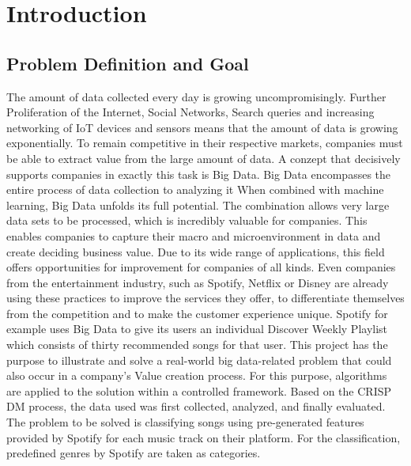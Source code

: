 \section{Introduction}

\subsection{Problem Definition and Goal}
The amount of data collected every day is growing uncompromisingly. Further Proliferation of the Internet, Social Networks, 
Search queries and increasing networking of IoT devices and sensors means that the amount of data is growing exponentially. 
To remain competitive in their respective markets, companies must be able to extract value from the large amount of data.
 A conzept that decisively supports companies in exactly this task is Big Data. Big Data encompasses the entire process of data collection to analyzing it
 When combined with machine learning, Big Data unfolds its full potential. The combination allows very large data sets to be processed, 
 which is incredibly valuable for companies. This enables companies to capture their macro and microenvironment in data and create deciding business value. 
 Due to its wide range of applications, this field offers opportunities for improvement for companies of all kinds. 
 Even companies from the entertainment industry, such as Spotify, Netflix or Disney are already using these practices to improve the services they offer, 
 to differentiate themselves from the competition and to make the customer experience unique. 
 Spotify for example uses Big Data to give its users an individual Discover Weekly Playlist which consists of thirty recommended songs for that user. 
 This project has the purpose to illustrate and solve a real-world big data-related problem that could also occur in a company's Value creation process. 
 For this purpose, algorithms are applied to the solution within a controlled framework. Based on the \ac{CRISP DM} process, the data used was first collected, analyzed, 
 and finally evaluated. The problem to be solved is classifying songs using pre-generated features provided by Spotify for each music track on their platform. 
 For the classification, predefined genres by Spotify are taken as categories.

